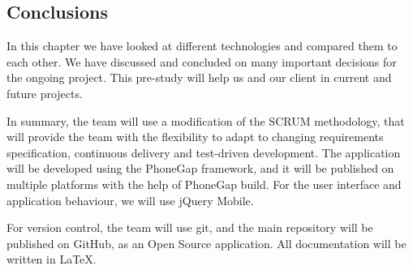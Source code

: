 \subsection{Conclusions}
In this chapter we have looked at different technologies and compared them to each other.  We have discussed and concluded on many important decisions for the ongoing project. This pre-study will help us and our client in current and future projects.

In summary, the team will use a modification of the SCRUM methodology, that will provide the team with the flexibility to adapt to changing requirements specification, continuous delivery and test-driven development. The application will be developed using the PhoneGap framework, and it will be published on multiple platforms with the help of PhoneGap build. For the user interface and application behaviour, we will use jQuery Mobile.

For version control, the team will use git, and the main repository will be published on GitHub, as an Open Source application. All documentation will be written in LaTeX.


